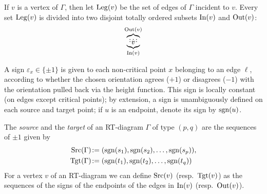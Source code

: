 If $v$ is a vertex of $\Gamma$, then let $\operatorname{Leg}(v)$ be the set of edges of
$\Gamma$ incident to $v$. Every set $\operatorname{Leg}(v)$ is divided into two
disjoint totally ordered subsets $\operatorname{In}(v)$ and $\operatorname{Out}(v)$:
\begin{equation*}
  {%
    \overbrace{\underbrace{\xy%
        (0,0)*{v},
        (0,1)*+[F]{\ };%
        (-1,0)**\dir{-},(-0.5,0)**\dir{-},(0,0.5)*{\ldots},(1,0)**\dir{-},%
        (-1,2)**\dir{-},(-0.5,2)**\dir{-},(0,1.5)*{\ldots},(1,2)**\dir{-},%
        \endxy}_{\In(v)}}^{\Out(v)}
    }
\end{equation*}

A sign $\varepsilon_x \in \{ \pm1 \}$ is given to each non-critical point $x$
belonging to an edge $\ell$, according to whether the chosen orientation
agrees ($+1$) or disagrees ($-1$) with the orientation pulled back via
the height function. This sign is locally constant (on edges except
critical points); by extension, a sign is unambiguously defined on
each source and target point; if $u$ is an endpoint, denote its sign
by $\operatorname{sgn}(u)$.
\begin{definition}
  The \emph{source} and the \emph{target} of an RT-diagram $\Gamma$ of
  type $(p,q)$ are the sequences of $\pm1$ given by
  \begin{align*}
    \Src(\Gamma) &\joinrel:= (\sgn(s_1),\sgn(s_2),\dots,\sgn(s_p)),
    \\
    \Tgt(\Gamma) &\joinrel:= (\sgn(t_1),\sgn(t_2),\dots,\sgn(t_q))
  \end{align*}
  For a vertex $v$ of an RT-diagram we can define $\operatorname{Src}(v)$ (resp.\ 
  $\operatorname{Tgt}(v)$) as the sequences of the signs of the endpoints of the
  edges in $\operatorname{In}(v)$ (resp.\ $\operatorname{Out}(v)$).
\end{definition}

